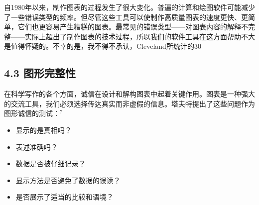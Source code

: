 自1980年以来，制作图表的过程发生了很大变化。普遍的计算和绘图软件可能减少了一些错误类型的频率。但尽管这些工具可以使制作高质量图表的速度更快、更简单，它们也更容易产生糟糕的图表。最常见的错误类型——对图表内容的解释不完整——实际上超出了制作图表的技术过程，所以我们的软件工具在这方面帮助不大是值得怀疑的。不幸的是，我不得不承认，Cleveland所统计的30%

\subsection*{4.3 图形完整性}
在科学写作的各个方面，诚信在设计和解构图表中起着关键作用。图表是一种强大的交流工具，我们必须选择传达真实而非虚假的信息。塔夫特提出了这些问题作为图形诚信的测试：${ }^{7}$

\begin{itemize}
\item 显示的是真相吗？
\item 表述准确吗？
\item 数据是否被仔细记录？
\item 显示方法是否避免了数据的误读？
\item 是否展示了适当的比较和语境？
\end{itemize}

